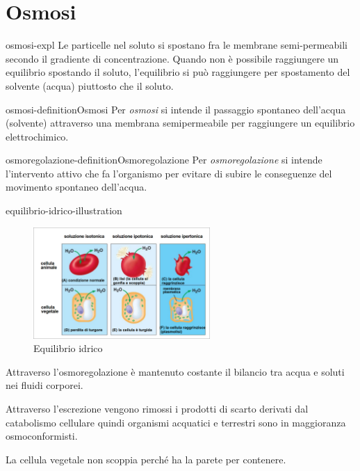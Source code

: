 \documentclass[preview]{standalone}
\begin{document}
\genpage

\section{Osmosi}

\begin{snippet}{osmosi-expl}
    Le particelle nel soluto si spostano fra le membrane semi-permeabili secondo il gradiente
di concentrazione. Quando non è possibile raggiungere un equilibrio spostando il soluto,
l'equilibrio si può raggiungere per spostamento del solvente (acqua) piuttosto che il soluto.
\end{snippet}

\begin{snippetdefinition}{osmosi-definition}{Osmosi}
    Per \textit{osmosi} si intende il passaggio spontaneo dell'acqua (solvente) attraverso una membrana semipermeabile
    per raggiungere un equilibrio elettrochimico.
\end{snippetdefinition}

\begin{snippetdefinition}{osmoregolazione-definition}{Osmoregolazione}
    Per \textit{osmoregolazione} si intende l'intervento attivo che fa l'organismo per evitare di subire le conseguenze del movimento spontaneo dell'acqua.
\end{snippetdefinition}

\begin{snippet}{equilibrio-idrico-illustration}
    \setlength{\intextsep}{0pt}%
    \begin{figure}
        \includegraphics[width=0.6\textwidth]{./resources/equilibrio_idrico.png}
        \caption{Equilibrio idrico}
        \vspace{-1cm}
    \end{figure}

    Attraverso l'osmoregolazione è mantenuto costante il bilancio tra acqua e soluti
    nei fluidi corporei.

    Attraverso l'escrezione vengono rimossi i prodotti di scarto
    derivati dal catabolismo cellulare quindi organismi acquatici e terrestri sono in
    maggioranza osmoconformisti.

    La cellula vegetale non scoppia perché ha la parete per contenere.

    \wrapfill
\end{snippet}
\end{document}

